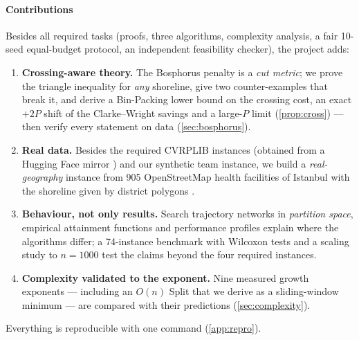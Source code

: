\paragraph{Contributions} Besides all required tasks (proofs, three algorithms, complexity
analysis, a fair 10-seed equal-budget protocol, an independent feasibility checker), the project adds:
\begin{enumerate}[label=\textbf{C\arabic*}]
\item \textbf{Crossing-aware theory.} The Bosphorus penalty is a \emph{cut metric}; we prove the
triangle inequality for \emph{any} shoreline, give two counter-examples that break it, and derive
a Bin-Packing lower bound on the crossing cost, an exact $+2P$ shift of the Clarke--Wright savings and
a large-$P$ limit (\cref{prop:cross}) --- then verify every statement on data (\cref{sec:bosphorus}).
\item \textbf{Real data.} Besides the required CVRPLIB instances (obtained from a Hugging Face mirror
\citep{ml4co2024vrplib}) and our synthetic team instance, we build a \emph{real-geography}
instance from 905 OpenStreetMap health facilities of Istanbul \citep{osm2026} with the shoreline
given by district polygons \citep{runfola2020geoboundaries}.
\item \textbf{Behaviour, not only results.} Search trajectory networks in \emph{partition space}, empirical
attainment functions \citep{lopezibanez2010exploratory} and performance profiles \citep{dolan2002benchmarking}
explain where the algorithms differ; a 74-instance benchmark with Wilcoxon tests and a scaling study to $n=1000$
test the claims beyond the four required instances.
\item \textbf{Complexity validated to the exponent.} Nine measured growth exponents --- including an $O(n)$
Split that we derive as a sliding-window minimum --- are compared with their predictions (\cref{sec:complexity}).
\end{enumerate}
Everything is reproducible with one command (\cref{app:repro}).
